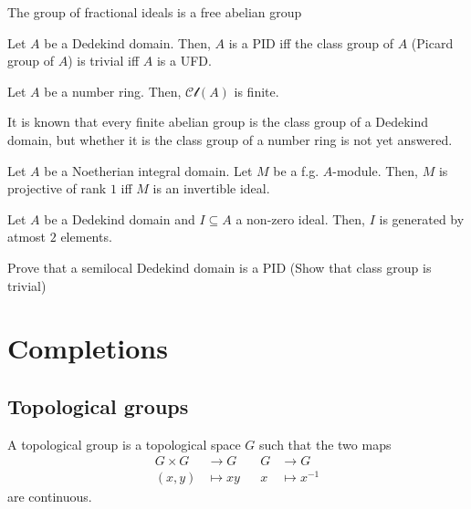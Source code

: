 \documentclass[oneside, 12pt]{scrbook}
\theoremstyle{theorem}
\begin{document}
\begin{corollary}
The group  of fractional ideals is a free abelian group
\end{corollary}

\begin{proposition}
Let $A$ be a Dedekind domain. Then, $A$ is a PID iff the class group of $A$ (Picard group of $A$) is trivial iff $A$ is a UFD.
\end{proposition}

\begin{theorem}
Let $A$ be a number ring. Then, $\mathcal{Cl}(A)$ is finite.
\end{theorem}

\begin{remark}
It is known that every finite abelian group is the class group of a Dedekind domain, but whether it is the class group of a number ring is not yet answered.
\end{remark}

\begin{proposition}
Let $A$ be a Noetherian integral domain. Let $M$ be a f.g. $A$-module. Then, $M$ is projective of rank $1$ iff $M$ is an invertible ideal.
\end{proposition}

\begin{theorem}
Let $A$ be a Dedekind domain and $I \subseteq A$ a non-zero ideal. Then, $I$ is generated by atmost $2$ elements.
\end{theorem}

\begin{exercise}
Prove that a semilocal Dedekind domain is a PID (Show that class group is trivial)
\end{exercise}


\chapter{Completions}

\section{Topological groups}

\begin{definition}
A topological group is a topological space $G$ such that the two maps 
\begin{align*}
G \times G &\rightarrow G && G &\rightarrow G \\
(x,y) &\mapsto xy && x &\mapsto x^{-1}
\end{align*}
are continuous.
\end{definition}
\end{document}
